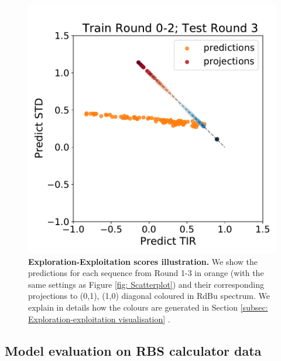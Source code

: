 \begin{figure}[!ht]
    \includegraphics[scale=0.35]{plots/Supplementary/proj_scatter_abc1_FF_2.pdf}
   \caption{\textbf{Exploration-Exploitation scores illustration.} We show the predictions for each sequence from Round 1-3 in orange (with the same settings as Figure \mbox{\ref{fig: Scatterplot}}) and their corresponding projections to (0,1), (1,0) diagonal coloured in RdBu spectrum.
    We explain in details how the colours are generated in Section \ref{subsec: Exploration-exploitation visualisation} .
   }
   \label{fig:exploitationvsexplorationdetail}
\end{figure}

\subsection{Model evaluation on RBS calculator data}
\label{subsec: Model evaluation on RBS calculator data}

